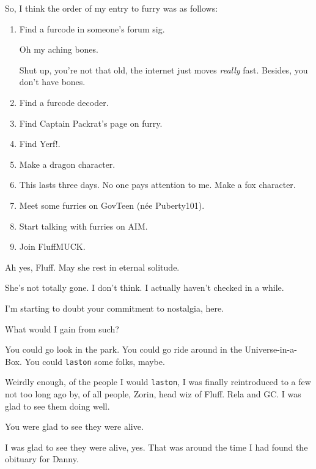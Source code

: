\begin{paracol}{2}
  \begin{leftcolumn}
\noindent So, I think the order of my entry to furry was as follows:

\begin{enumerate}
\def\labelenumi{\arabic{enumi}.}
\item
  Find a furcode in someone's forum sig.

  \begin{ally}
  Oh my aching bones.
  \end{ally}
  Shut up, you're not that old, the internet just moves \emph{really} fast. Besides, you don't have bones.
\item
  Find a furcode decoder.
\item
  Find Captain Packrat's page on furry.
\item
  Find Yerf!.
\item
  Make a dragon character.
\item
  This lasts three days. No one pays attention to me. Make a fox character.
\item
  Meet some furries on GovTeen (née Puberty101).
\item
  Start talking with furries on AIM.
\item
  Join FluffMUCK.
\end{enumerate}

\begin{ally}
Ah yes, Fluff. May she rest in eternal solitude.
\end{ally}
She's not totally gone. I don't think. I actually haven't checked in a while.

\begin{ally}
I'm starting to doubt your commitment to nostalgia, here.
\end{ally}
What would I gain from such?

\begin{ally}
You could go look in the park. You could go ride around in the Universe-in-a-Box. You could \texttt{laston} some folks, maybe.
\end{ally}
Weirdly enough, of the people I would \texttt{laston}, I was finally reintroduced to a few not too long ago by, of all people, Zorin, head wiz of Fluff. Rela and GC. I was glad to see them doing well.

\begin{ally}
You were glad to see they were alive.
\end{ally}
I was glad to see they were alive, yes. That was around the time I had found the obituary for Danny.


\end{leftcolumn}
\end{paracol}
